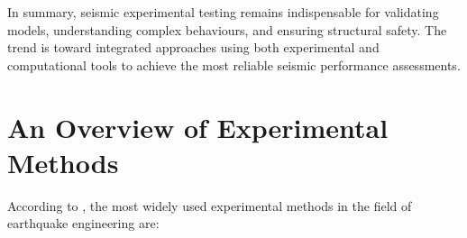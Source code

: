 \documentclass[  10pt, twoside]{report} %
\numberwithin{equation}{chapter}
\begin{document}
In summary, seismic experimental testing remains indispensable for validating models, understanding complex behaviours, and ensuring structural safety. The trend is toward integrated approaches using both experimental and computational tools to achieve the most reliable seismic performance assessments.\citep{williams2001, Zhang2023Experimentally, Liu2020Experimental, Bahraq2021Numerical, Malomo2022M-DEM, Qiu2024Seismic, Yavas2023A, Mokhtari2023A}

\section{An Overview of Experimental Methods}
According to \cite{williams2001}, the most widely used experimental methods in the field of earthquake engineering are:
\end{document}
